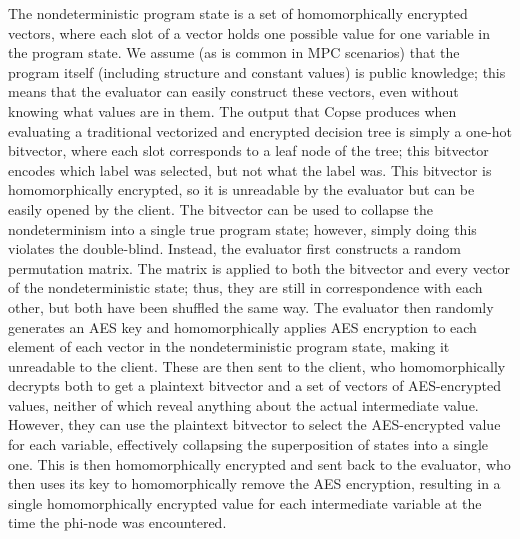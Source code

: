 \documentclass{article}
\begin{document}
The nondeterministic program state is a set of homomorphically encrypted vectors, where each slot of a vector holds one possible value for one variable in the program state.
We assume (as is common in MPC scenarios) that the program itself (including structure and constant values) is public knowledge; this means that the evaluator can easily construct these vectors, even without knowing what values are in them.
The output that Copse produces when evaluating a traditional vectorized and encrypted decision tree is simply a one-hot bitvector, where each slot corresponds to a leaf node of the tree; this bitvector encodes which label was selected, but not what the label was.
This bitvector is homomorphically encrypted, so it is unreadable by the evaluator but can be easily opened by the client.
The bitvector can be used to collapse the nondeterminism into a single true program state; however, simply doing this violates the double-blind.
Instead, the evaluator first constructs a random permutation matrix.
The matrix is applied to both the bitvector and every vector of the nondeterministic state; thus, they are still in correspondence with each other, but both have been shuffled the same way.
The evaluator then randomly generates an AES key and homomorphically applies AES encryption to each element of each vector in the nondeterministic program state, making it unreadable to the client.
These are then sent to the client, who homomorphically decrypts both to get a plaintext bitvector and a set of vectors of AES-encrypted values, neither of which reveal anything about the actual intermediate value.
However, they can use the plaintext bitvector to select the AES-encrypted value for each variable, effectively collapsing the superposition of states into a single one.
This is then homomorphically encrypted and sent back to the evaluator, who then uses its key to homomorphically remove the AES encryption, resulting in a single homomorphically encrypted value for each intermediate variable at the time the phi-node was encountered.
\end{document}
